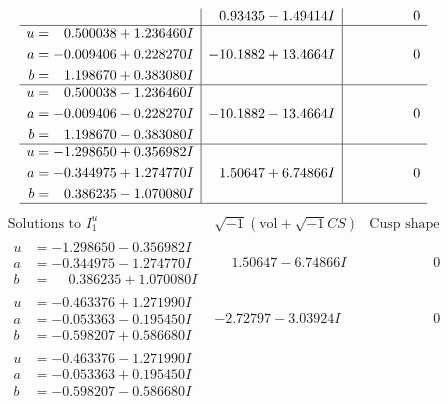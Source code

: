 \documentclass[1p]{elsarticle_modified}
\theoremstyle{definition}
\newcommand{\I}{\sqrt{-1}}
\begin{document}
$$\begin{array}{c|c|c}
 & \phantom{-}0.93435 - 1.49414 I & \phantom{-0.000000 } 0 \\ \hline\begin{aligned}
u &= \phantom{-}0.500038 + 1.236460 I \\
a &= -0.009406 + 0.228270 I \\
b &= \phantom{-}1.198670 + 0.383080 I\end{aligned}
 & -10.1882 + 13.4664 I & \phantom{-0.000000 } 0 \\ \hline\begin{aligned}
u &= \phantom{-}0.500038 - 1.236460 I \\
a &= -0.009406 - 0.228270 I \\
b &= \phantom{-}1.198670 - 0.383080 I\end{aligned}
 & -10.1882 - 13.4664 I & \phantom{-0.000000 } 0 \\ \hline\begin{aligned}
u &= -1.298650 + 0.356982 I \\
a &= -0.344975 + 1.274770 I \\
b &= \phantom{-}0.386235 - 1.070080 I\end{aligned}
 & \phantom{-}1.50647 + 6.74866 I & \phantom{-0.000000 } 0\\
 \hline 
 \end{array}$$\newpage$$\begin{array}{c|c|c}  
\text{Solutions to }I^u_{1}& \I (\text{vol} + \sqrt{-1}CS) & \text{Cusp shape}\\
 \hline 
\begin{aligned}
u &= -1.298650 - 0.356982 I \\
a &= -0.344975 - 1.274770 I \\
b &= \phantom{-}0.386235 + 1.070080 I\end{aligned}
 & \phantom{-}1.50647 - 6.74866 I & \phantom{-0.000000 } 0 \\ \hline\begin{aligned}
u &= -0.463376 + 1.271990 I \\
a &= -0.053363 - 0.195450 I \\
b &= -0.598207 + 0.586680 I\end{aligned}
 & -2.72797 - 3.03924 I & \phantom{-0.000000 } 0 \\ \hline\begin{aligned}
u &= -0.463376 - 1.271990 I \\
a &= -0.053363 + 0.195450 I \\
b &= -0.598207 - 0.586680 I\end{aligned}

\end{array}$$
\end{document}
